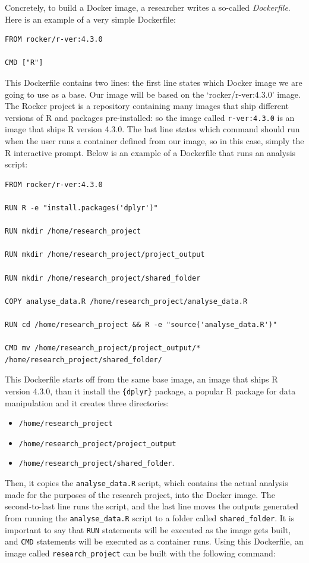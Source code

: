 \documentclass[
  letterpaper,
  DIV=11,
  numbers=noendperiod]{scrartcl}
\providecommand{\tightlist}{%
  \setlength{\itemsep}{0pt}\setlength{\parskip}{0pt}}\usepackage{longtable,booktabs,array}
\begin{document}
Concretely, to build a Docker image, a researcher writes a so-called
\emph{Dockerfile}. Here is an example of a very simple Dockerfile:

\begin{verbatim}
FROM rocker/r-ver:4.3.0

CMD ["R"]
\end{verbatim}

This Dockerfile contains two lines: the first line states which Docker
image we are going to use as a base. Our image will be based on the
`rocker/r-ver:4.3.0' image. The Rocker project is a repository
containing many images that ship different versions of R and packages
pre-installed: so the image called \texttt{r-ver:4.3.0} is an image that
ships R version 4.3.0. The last line states which command should run
when the user runs a container defined from our image, so in this case,
simply the R interactive prompt. Below is an example of a Dockerfile
that runs an analysis script:

\begin{verbatim}
FROM rocker/r-ver:4.3.0

RUN R -e "install.packages('dplyr')"

RUN mkdir /home/research_project

RUN mkdir /home/research_project/project_output

RUN mkdir /home/research_project/shared_folder

COPY analyse_data.R /home/research_project/analyse_data.R

RUN cd /home/research_project && R -e "source('analyse_data.R')"

CMD mv /home/research_project/project_output/* /home/research_project/shared_folder/
\end{verbatim}

This Dockerfile starts off from the same base image, an image that ships
R version 4.3.0, than it install the \texttt{\{dplyr\}} package, a
popular R package for data manipulation and it creates three
directories:

\begin{itemize}
\tightlist
\item
  \texttt{/home/research\_project}
\item
  \texttt{/home/research\_project/project\_output}
\item
  \texttt{/home/research\_project/shared\_folder}.
\end{itemize}

Then, it copies the \texttt{analyse\_data.R} script, which contains the
actual analysis made for the purposes of the research project, into the
Docker image. The second-to-last line runs the script, and the last line
moves the outputs generated from running the \texttt{analyse\_data.R}
script to a folder called \texttt{shared\_folder}. It is important to
say that \texttt{RUN} statements will be executed as the image gets
built, and \texttt{CMD} statements will be executed as a container runs.
Using this Dockerfile, an image called \texttt{research\_project} can be
built with the following command:
\end{document}
